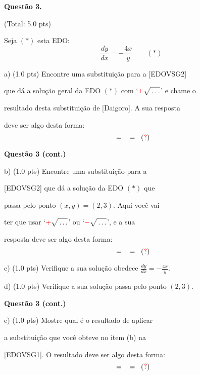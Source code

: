 \documentclass[oneside,12pt]{article}
\begin{document}
{\bf Questão 3.}

\T(Total: 5.0 pts)

Seja $(*)$ esta EDO:
%
$$\frac{dy}{dx} = -\frac{4x}{y} \qquad (*)$$

a) \B(1.0 pts) Encontre uma substituição para a [EDOVSG2]

que dá a solução geral da EDO $(*)$ com `$\ssqrt{\pm}$' e chame o

resultado desta substituição de [Daigoro]. A sua resposta

deve ser algo desta forma:
%
$$\ga{Daigoro} \;\;=\;\; \ga{Edovsg2} \ga{SDaigoro} \;\;=\;\; (\rq)$$


\newpage


{\bf Questão 3 (cont.)}

\msk


b) \B(1.0 pts) Encontre uma substituição para a

[EDOVSG2] que dá a solução da EDO $(*)$ que

passa pelo ponto $(x,y)=(2,3)$. Aqui você vai

ter que usar `$\ssqrt{+}$' ou `$\ssqrt{-}$', e a sua

resposta deve ser algo desta forma:
%
$$\ga{Itto} \;\;=\;\; \ga{Edovsg2} \ga{SItto} \;\;=\;\; (\rq)$$


c) \B(1.0 pts) Verifique a sua solução obedece $\frac{dy}{dx}=-\frac{4x}{y}$.

d) \B(1.0 pts) Verifique a sua solução passa pelo ponto $(2,3)$.



\newpage

{\bf Questão 3 (cont.)}

\msk

e) \B(1.0 pts) Mostre qual é o resultado de aplicar

a substituição que você obteve no item (b) na

[EDOVSG1]. O resultado deve ser algo desta forma:
%
$$\ga{Ogami} \;\;=\;\; \ga{Edovsg1} \ga{SItto} \;\;=\;\; (\rq)$$


\newpage


%
\end{document}
